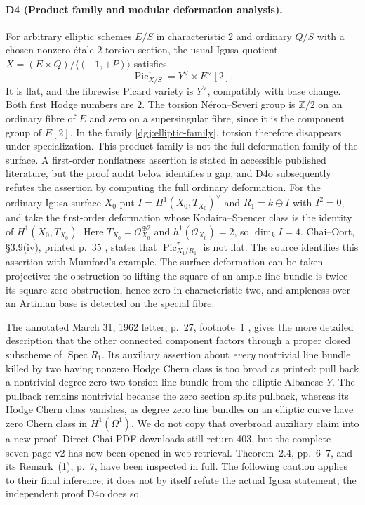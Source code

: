 \paragraph{D4 (Product family and modular deformation analysis).}
For arbitrary elliptic schemes $E/S$ in characteristic $2$ and ordinary
$Q/S$ with a chosen nonzero étale $2$-torsion section, the usual Igusa
quotient $X=(E\times Q)/\langle(-1,+P)\rangle$ satisfies
\[
 \operatorname{Pic}^{\tau}_{X/S}=Y^\vee\times E^\vee[2].
\]
It is flat, and the fibrewise Picard variety is $Y^\vee$, compatibly
with base change.  Both first Hodge numbers are $2$.
The torsion Néron--Severi group is $\mathbb Z/2$ on an ordinary fibre
of $E$ and zero on a supersingular fibre, since it is the component
group of $E[2]$.  In the family \eqref{dgj:elliptic-family}, torsion
therefore disappears under specialization.  This product family is
not the full deformation family of the surface.  A first-order
nonflatness assertion is stated in accessible published literature,
but the proof audit below identifies a gap, and D4o subsequently refutes the assertion by computing the full ordinary deformation.  For the ordinary
Igusa surface $X_0$ put $I=H^1(X_0,T_{X_0})^\vee$ and
$R_1=k\oplus I$ with $I^2=0$, and take the first-order deformation
whose Kodaira--Spencer class is the identity of $H^1(X_0,T_{X_0})$.
Here $T_{X_0}=\mathcal O_{X_0}^{\oplus2}$ and
$h^1(\mathcal O_{X_0})=2$, so $\dim_k I=4$.
Chai--Oort, \S3.9(iv), printed p.~35
\cite{DGJ_ChaiOort2017}, states that
$\operatorname{Pic}^{\tau}_{X_1/R_1}$ is not flat.
The source identifies this assertion with Mumford's example.
The surface deformation
can be taken projective: the obstruction to lifting the square of
an ample line bundle is twice its square-zero obstruction, hence
zero in characteristic two, and ampleness over an Artinian base
is detected on the special fibre.

The annotated March 31, 1962 letter, p.~27, footnote~1
\cite{DGJ_GrothMumfordLetters}, gives the more detailed description
that the other connected component factors through a proper closed
subscheme of $\operatorname{Spec}R_1$.  Its auxiliary assertion
about \emph{every} nontrivial line bundle killed by two having
nonzero Hodge Chern class is too broad as printed: pull back a
nontrivial degree-zero two-torsion line bundle from the elliptic
Albanese $Y$.  The pullback remains nontrivial because the zero
section splits pullback, whereas its Hodge Chern class vanishes,
as degree zero line bundles on an elliptic curve have zero Chern
class in $H^1(\Omega^1)$.  We do not copy that overbroad auxiliary
claim into a new proof.  Direct Chai PDF downloads still return 403,
but the complete seven-page v2 has now been opened in web retrieval.
Theorem~2.4, pp.~6--7, and its Remark~(1), p.~7, have been inspected
in full.  The following caution applies to their final inference;
it does not by itself refute the actual Igusa statement; the independent proof D4o does so.

